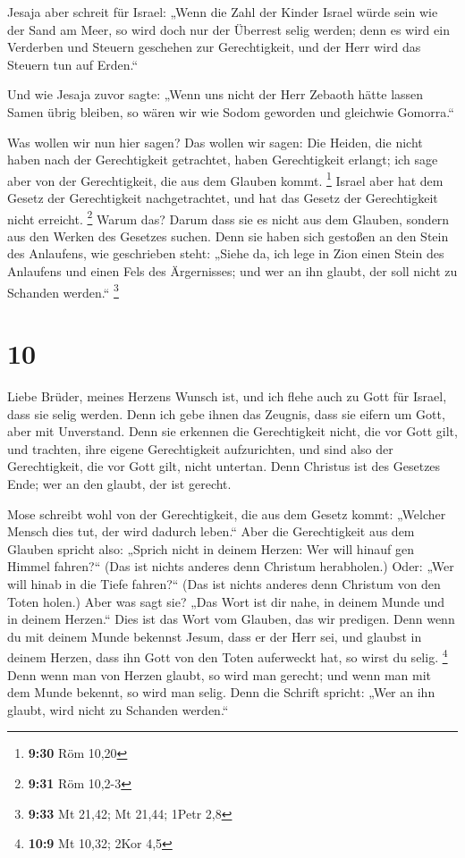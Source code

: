  Jesaja aber schreit für Israel: „Wenn die Zahl der Kinder
Israel würde sein wie der Sand am Meer, so wird doch nur der Überrest
selig werden;  denn es wird ein Verderben und Steuern
geschehen zur Gerechtigkeit, und der Herr wird das Steuern tun auf
Erden.``

 Und wie Jesaja zuvor sagte: „Wenn uns nicht der Herr
Zebaoth hätte lassen Samen übrig bleiben, so wären wir wie Sodom
geworden und gleichwie Gomorra.``

 Was wollen wir nun hier sagen? Das wollen wir sagen: Die
Heiden, die nicht haben nach der Gerechtigkeit getrachtet, haben
Gerechtigkeit erlangt; ich sage aber von der Gerechtigkeit, die aus dem
Glauben kommt. \footnote{\textbf{9:30} Röm 10,20}  Israel
aber hat dem Gesetz der Gerechtigkeit nachgetrachtet, und hat das Gesetz
der Gerechtigkeit nicht erreicht. \footnote{\textbf{9:31} Röm 10,2-3}
 Warum das? Darum dass sie es nicht aus dem Glauben,
sondern aus den Werken des Gesetzes suchen. Denn sie haben sich gestoßen
an den Stein des Anlaufens,  wie geschrieben steht: „Siehe
da, ich lege in Zion einen Stein des Anlaufens und einen Fels des
Ärgernisses; und wer an ihn glaubt, der soll nicht zu Schanden werden.``
\footnote{\textbf{9:33} Mt 21,42; Mt 21,44; 1Petr 2,8}

\hypertarget{section-3}{%
\section{10}\label{section-3}}

 Liebe Brüder, meines Herzens Wunsch ist, und ich flehe auch
zu Gott für Israel, dass sie selig werden.  Denn ich gebe
ihnen das Zeugnis, dass sie eifern um Gott, aber mit Unverstand.
 Denn sie erkennen die Gerechtigkeit nicht, die vor Gott
gilt, und trachten, ihre eigene Gerechtigkeit aufzurichten, und sind
also der Gerechtigkeit, die vor Gott gilt, nicht untertan. 
Denn Christus ist des Gesetzes Ende; wer an den glaubt, der ist gerecht.

 Mose schreibt wohl von der Gerechtigkeit, die aus dem
Gesetz kommt: „Welcher Mensch dies tut, der wird dadurch leben.``
 Aber die Gerechtigkeit aus dem Glauben spricht also:
„Sprich nicht in deinem Herzen: Wer will hinauf gen Himmel fahren?{}``
(Das ist nichts anderes denn Christum herabholen.)  Oder:
„Wer will hinab in die Tiefe fahren?{}`` (Das ist nichts anderes denn
Christum von den Toten holen.)  Aber was sagt sie? „Das Wort
ist dir nahe, in deinem Munde und in deinem Herzen.`` Dies ist das Wort
vom Glauben, das wir predigen.  Denn wenn du mit deinem
Munde bekennst Jesum, dass er der Herr sei, und glaubst in deinem
Herzen, dass ihn Gott von den Toten auferweckt hat, so wirst du selig.
\footnote{\textbf{10:9} Mt 10,32; 2Kor 4,5}  Denn wenn man
von Herzen glaubt, so wird man gerecht; und wenn man mit dem Munde
bekennt, so wird man selig.  Denn die Schrift spricht: „Wer
an ihn glaubt, wird nicht zu Schanden werden.``

